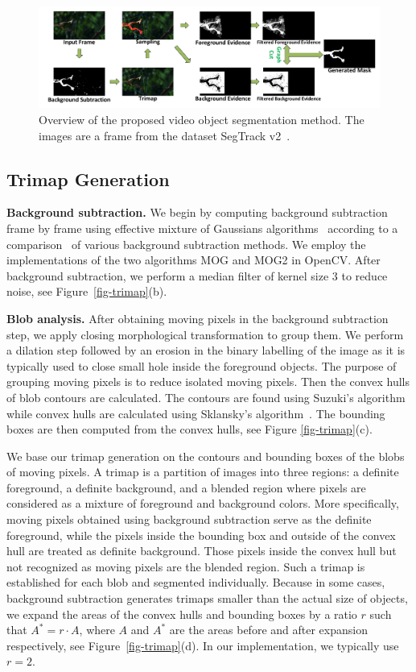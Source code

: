 \begin{figure}
	\centering
	\includegraphics[width=\textwidth]{figures/overview.pdf}
	\caption{Overview of the proposed video object segmentation method. The images are a frame from the dataset SegTrack v2~\cite{f-li2013}.}
	\label{fig-overview}
\end{figure}

\subsection{Trimap Generation}
\label{sec:vos:m:tg}

\textbf{Background subtraction.}
We begin by computing background subtraction frame by frame using effective  mixture of Gaussians algorithms~\cite{kaewtrakulpong2002,zivkovic2004} according to a comparison~\cite{sobral2014} of various background subtraction methods. We employ the implementations of the two algorithms MOG and MOG2 in OpenCV. After background subtraction, we perform a median filter of kernel size 3 to reduce noise, see Figure~\ref{fig-trimap}(b).

\textbf{Blob analysis.}
After obtaining moving pixels in the background subtraction step, we apply closing morphological transformation to group them. We perform a dilation step followed by an erosion in the binary labelling of the image as it is typically used to close small hole inside the foreground objects.
The purpose of grouping moving pixels is to reduce isolated moving pixels.
Then the convex hulls of blob contours are calculated. The contours are found using Suzuki's algorithm~\cite{suzuki1985} while convex hulls are calculated using Sklansky's algorithm~\cite{sklansky1982}. The bounding boxes are then computed from the convex hulls, see Figure \ref{fig-trimap}(c).

We base our trimap generation on the contours and bounding boxes of the blobs of moving pixels.
A trimap is a partition of images into three regions: a definite foreground, a definite background, and a blended region where pixels are considered as a mixture of foreground and background colors.
More specifically, moving pixels obtained using background subtraction serve as the definite foreground, while the pixels inside the bounding box and outside of the convex hull are treated as definite background.
Those pixels inside the convex hull but not recognized as moving pixels are the blended region.
Such a trimap is established for each blob and segmented individually.
Because in some cases, background subtraction generates trimaps smaller than the actual size of objects, we expand the areas of the convex hulls and bounding boxes by a ratio $r$ such that $A^{*}=r\cdot A$, where $A$ and $A^{*}$ are the areas before and after expansion respectively, see Figure~\ref{fig-trimap}(d).  In our implementation, we typically use $r=2$.

